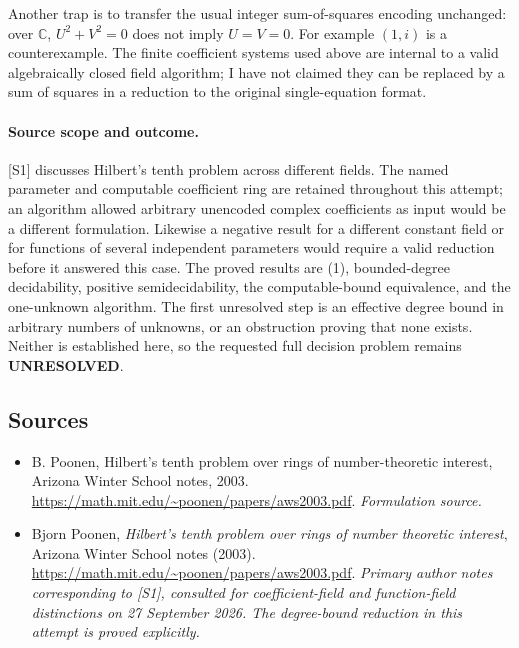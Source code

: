 \documentclass[11pt]{article}
\begin{document}
Another trap is to transfer the usual integer sum-of-squares encoding
unchanged: over $\mathbb C$, $U^2+V^2=0$ does not imply $U=V=0$.
For example $(1,i)$ is a counterexample. The finite coefficient systems
used above are internal to a valid algebraically closed field algorithm;
I have not claimed they can be replaced by a sum of squares in a
reduction to the original single-equation format.

\paragraph{Source scope and outcome.}
[S1] discusses Hilbert's tenth problem across different fields. The
named parameter and computable coefficient ring are retained throughout
this attempt; an algorithm allowed arbitrary unencoded complex
coefficients as input would be a different formulation. Likewise a
negative result for a different constant field or for functions of
several independent parameters would require a valid reduction before
it answered this case. The proved results are (1), bounded-degree
decidability, positive semidecidability, the computable-bound
equivalence, and the one-unknown algorithm. The first unresolved step
is an effective degree bound in arbitrary numbers of unknowns, or an
obstruction proving that none exists. Neither is established here, so
the requested full decision problem remains \textbf{UNRESOLVED}.

\subsection{Sources}
\begin{itemize}
\item[S1]B. Poonen, Hilbert's tenth problem over rings of number-theoretic interest, Arizona Winter School notes, 2003.
\url{https://math.mit.edu/~poonen/papers/aws2003.pdf}.
\textit{Formulation source.}
\item[E1]Bjorn Poonen, \emph{Hilbert's tenth problem over rings of number
theoretic interest}, Arizona Winter School notes (2003).
\url{https://math.mit.edu/~poonen/papers/aws2003.pdf}.
\textit{Primary author notes corresponding to [S1], consulted for
coefficient-field and function-field distinctions on 27 September 2026.
The degree-bound reduction in this attempt is proved explicitly.}

\end{itemize}
\end{document}

